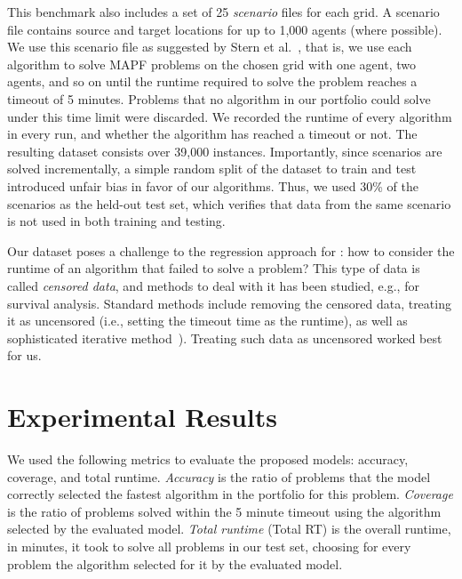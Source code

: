 \documentclass[letterpaper]{article} %
\begin{document}
This benchmark also includes a set of 25 \emph{scenario} files for each grid. A scenario file contains source and target locations for up to 1,000 agents (where possible). 
We use this scenario file as suggested by Stern et al.~\cite{stern2019multiagent}, that is, we use each algorithm to solve MAPF problems on the chosen grid with one agent, two agents, and so on until the runtime required to solve the problem reaches a timeout of 5 minutes. 
Problems that no algorithm in our portfolio could solve under this time limit were discarded. 
We recorded the runtime of every algorithm in every run, and whether the algorithm has reached a timeout or not.
The resulting dataset consists over 39,000 instances.
Importantly, since scenarios are solved incrementally, a simple random split of the dataset to train and test introduced unfair bias in favor of our \AS algorithms. Thus, we used 30\% of the scenarios as the held-out test set, which verifies that data from the same scenario is not used in both training and testing. 

Our dataset poses a challenge to the regression approach for \AS: how to consider the runtime of an algorithm that failed to solve a problem? This type of data is called \emph{censored data}, and methods to deal with it has been studied, e.g., for survival analysis. Standard methods include removing the censored data, treating it as uncensored (i.e., setting the timeout time as the runtime), as well as sophisticated iterative method~\cite{schmee1979simple}). Treating such data as uncensored worked best for us. %








\section{Experimental Results}

We used the following metrics to evaluate the proposed \AS models: accuracy, coverage, and total runtime. 
\emph{Accuracy} is the ratio of problems that the \AS model correctly selected the fastest algorithm in the portfolio for this problem. 
\emph{Coverage} is the ratio of problems solved within the 5 minute timeout using the algorithm selected by the evaluated model. 
\emph{Total runtime} (Total RT) is the overall runtime, in minutes, it took to solve all problems in our test set, choosing for every problem the algorithm selected for it by the evaluated model. 
\end{document}
